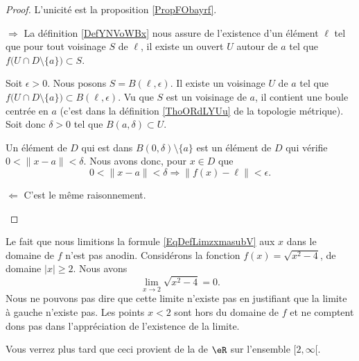 \begin{proof}
    L'unicité est la proposition \ref{PropFObayrf}.

    \begin{subproof}
    \item[\( \Rightarrow\)]
        La définition \ref{DefYNVoWBx} nous assure de l'existence d'un élément \( \ell\) tel que pour tout voisinage \( S\) de \( \ell\), il existe un ouvert \( U\) autour de \( a\) tel que \( f\big( U\cap D\setminus\{ a \} \big)\subset S\).

        Soit \( \epsilon>0\). Nous posons \( S=B(\ell,\epsilon)\). Il existe un voisinage \( U\) de \( a\) tel que \( f\big( U\cap D\setminus\{ a \} \big)\subset B(\ell,\epsilon)\). Vu que \( S\) est un voisinage de \( a\), il contient une boule centrée en \( a\) (c'est dans la définition \ref{ThoORdLYUu} de la topologie métrique). Soit donc \( \delta>0\) tel que \( B(a,\delta)\subset U\).

        Un élément de \( D\) qui est dans \( B(0,\delta)\setminus \{ a \}\) est un élément de \( D\) qui vérifie \( 0<\| x-a \|<\delta\). Nous avons donc, pour \( x\in D\) que
        \begin{equation}
            0<\| x-a \|<\delta\Rightarrow \| f(x)-\ell \|<\epsilon.
        \end{equation}
    \item[\( \Leftarrow\)] C'est le même raisonnement.
    \end{subproof}
\end{proof}


\begin{remark}
    Le fait que nous limitions la formule \eqref{EqDefLimzxmasubV} aux \( x\) dans le domaine de \( f\) n'est pas anodin. Considérons la fonction \( f(x)=\sqrt{x^2-4}\), de domaine \( | x |\geq 2\). Nous avons
    \begin{equation}
        \lim_{x\to 2} \sqrt{x^2-4}=0.
    \end{equation}
    Nous ne pouvons pas dire que cette limite n'existe pas en justifiant que la limite à gauche n'existe pas. Les points \( x<2\) sont hors du domaine de \( f\) et ne comptent dons pas dans l'appréciation de l'existence de la limite.

    Vous verrez plus tard que ceci provient de la  de \( \eR\) sur l'ensemble \( \mathopen[ 2 , \infty [\).
\end{remark}


